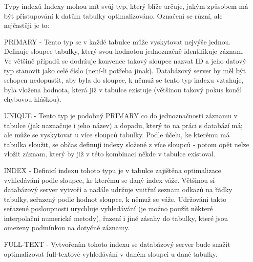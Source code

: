 \begin{obecne}{Typy indexů}
Indexy mohou mít svůj typ, který blíže určuje, jakým způsobem má být přistupování k datům tabulky optimalizováno. Označení se různí, ale nejčastěji je to:
\begin{pitemize}
    \item PRIMARY - Tento typ se v každé tabulce může vyskytovat nejvýše jednou. Definuje sloupec tabulky, který svou hodnotou jednoznačně identifikuje záznam. Ve většině případů se dodržuje konvence takový sloupec nazvat ID a jeho datový typ stanovit jako celé číslo (není-li potřeba jinak). Databázový server by měl být schopen nedopustit, aby byla do sloupce, k němuž se tento typ indexu vztahuje, byla vložena hodnota, která již v tabulce existuje (většinou takový pokus končí chybovou hláškou). 
    \item UNIQUE - Tento typ je podobný PRIMARY co do jednoznačnosti záznamu v tabulce (jak naznačuje i jeho název) a dopadu, který to na práci s databází má; ale může se vyskytovat u více sloupců tabulky. Podle účelu, ke kterému má tabulka sloužit, se občas definují indexy složené z více sloupců - potom opět nelze vložit záznam, který by již v této kombinaci někde v tabulce existoval. 
    \item INDEX - Definicí indexu tohoto typu je v tabulce zajištěna optimalizace vyhledávání podle sloupce, ke kterému se daný index váže. Většinou si databázový server vytvoří a nadále udržuje vnitřní seznam odkazů na řádky tabulky, seřazený podle hodnot sloupce, k němuž se váže. Udržování takto seřazené posloupnosti urychluje vyhledávání (je možno použít některé interpolační numerické metody), řazení i jiné zásahy do tabulky, které jsou omezeny podmínkou na dotyčné záznamy. 
    \item FULL-TEXT - Vytvořením tohoto indexu se databázový server bude snažit optimalizovat full-textové vyhledávání v daném sloupci u dané tabulky.
\end{pitemize}
\end{obecne}

